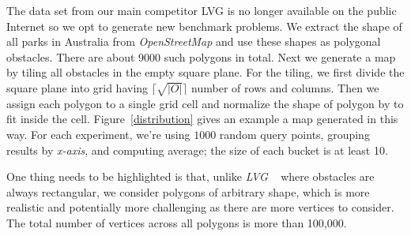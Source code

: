 The data set from our main competitor LVG\cite{zhang2004spatial}
is no longer available on the public Internet so we opt to generate new benchmark problems.
We extract the shape of all parks in Australia from \textit{OpenStreetMap}\cite{OpenStreetMap} and
use these shapes as polygonal obstacles. There are about 9000 such polygons in total.
Next we generate a map by tiling all obstacles in the empty square plane.
For the tiling, we first divide the square plane into grid having $\lceil\sqrt{|O|}\rceil$ number of rows and columns.
Then we assign each polygon to a single grid cell and normalize the shape of polygon by to fit inside the cell.
Figure~\ref{distribution} gives an example a map generated in this way.
For each experiment, we're using $1000$ random query points, grouping results by
\textit{x-axis}, and computing average; the size of each bucket is at least 10. 

One thing needs to be highlighted is that,
unlike \textit{LVG} ~\cite{zhang2004spatial} where obstacles are always rectangular,
we consider polygons of arbitrary shape, which is more realistic and potentially more challenging as there are more vertices to consider.
The total number of vertices across all polygons is more than 100,000. 


